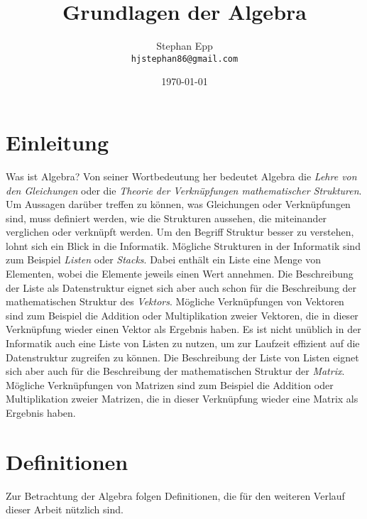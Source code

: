 \documentclass[oneside]{scrbook}
\title{Grundlagen der Algebra}
\author{Stephan Epp\\\texttt{hjstephan86@gmail.com}}
\date{\today}
\numberwithin{equation}{section}
\begin{document}
	\maketitle
	\vspace{5em}
	\tableofcontents
\chapter{Einleitung}
Was ist Algebra? Von seiner Wortbedeutung her bedeutet Algebra die \textit{Lehre von den Gleichungen} oder die \textit{Theorie der Verknüpfungen mathematischer Strukturen}. Um Aussagen darüber treffen zu können, was Gleichungen oder Verknüpfungen sind, muss definiert werden, wie die Strukturen aussehen, die miteinander verglichen oder verknüpft werden. Um den Begriff Struktur besser zu verstehen, lohnt sich ein Blick in die Informatik. Mögliche Strukturen in der Informatik sind zum Beispiel \textit{Listen} oder \textit{Stacks}. Dabei enthält ein Liste eine Menge von Elementen, wobei die Elemente jeweils einen Wert annehmen. Die Beschreibung der Liste als Datenstruktur eignet sich aber auch schon für die Beschreibung der mathematischen Struktur des \textit{Vektors}. Mögliche Verknüpfungen von Vektoren sind zum Beispiel die Addition oder Multiplikation zweier Vektoren, die in dieser Verknüpfung wieder einen Vektor als Ergebnis haben. Es ist nicht unüblich in der Informatik auch eine Liste von Listen zu nutzen, um zur Laufzeit effizient auf die Datenstruktur zugreifen zu können. Die Beschreibung der Liste von Listen eignet sich aber auch für die Beschreibung der mathematischen Struktur der \textit{Matrix}. Mögliche Verknüpfungen von Matrizen sind zum Beispiel die Addition oder Multiplikation zweier Matrizen, die in dieser Verknüpfung wieder eine Matrix als Ergebnis haben.
\chapter{Definitionen}
Zur Betrachtung der Algebra folgen Definitionen, die für den weiteren Verlauf dieser Arbeit nützlich sind.
\end{document}
